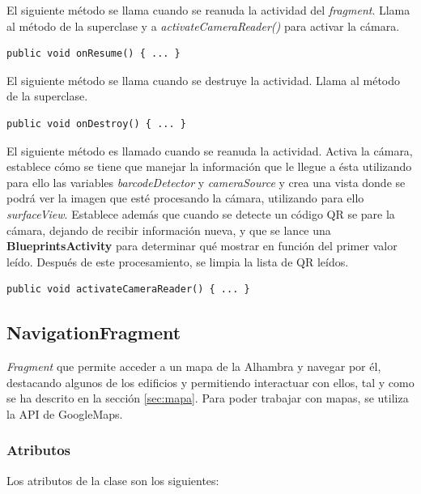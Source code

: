 \documentclass[11pt,a4paper]{article}
\begin{document}
El siguiente método se llama cuando se reanuda la actividad del \textit{fragment}. Llama al método de la superclase y a
\textit{activateCameraReader()} para activar la cámara.

\begin{lstlisting}
public void onResume() { ... }
\end{lstlisting}

El siguiente método se llama cuando se destruye la actividad. Llama al método de la superclase.

\begin{lstlisting}
public void onDestroy() { ... }
\end{lstlisting}

El siguiente método es llamado cuando se reanuda la actividad. Activa la cámara, establece cómo se tiene que manejar la información
que le llegue a ésta utilizando para ello las variables \textit{barcodeDetector} y \textit{cameraSource} y crea una vista donde se podrá
ver la imagen que esté procesando la cámara, utilizando para ello \textit{surfaceView}. Establece además que cuando se detecte un
código QR se pare la cámara, dejando de recibir información nueva, y que se lance una \textbf{BlueprintsActivity} para determinar qué mostrar
en función del primer valor leído. Después de este procesamiento, se limpia la lista de QR leídos.

\begin{lstlisting}
public void activateCameraReader() { ... }
\end{lstlisting}

\subsection{\textbf{NavigationFragment}}
\label{sec:nav}

\textit{Fragment} que permite acceder a un mapa de la Alhambra y navegar por él, destacando
algunos de los edificios y permitiendo interactuar con ellos, tal y como se ha descrito en la sección \ref{sec:mapa}.
Para poder trabajar con mapas, se utiliza la API de GoogleMaps.

\subsubsection{Atributos}

Los atributos de la clase son los siguientes:
\end{document}
